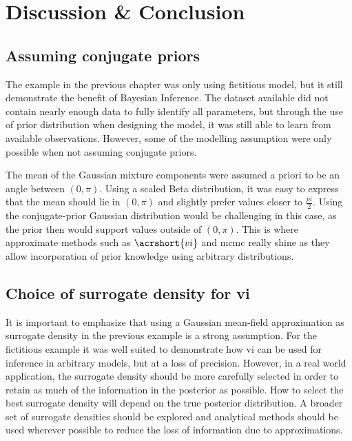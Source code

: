 \chapter{Discussion \& Conclusion}\label{chap:discussion}

\section{Assuming conjugate priors}\label{sec:discuss_conjugate_priors}
The example in the previous chapter was only using fictitious model, but it still demonstrate the benefit of Bayesian Inference. The dataset available did not contain nearly enough data to fully identify all parameters, but through the use of prior distribution when designing the model, it was still able to learn from available observations. However, some of the modelling assumption were only possible when not assuming conjugate priors.

The mean of the Gaussian mixture components were assumed a priori to be an angle between $(0, \pi)$. Using a scaled Beta distribution, it was easy to express that the mean should lie in $(0, \pi)$ and slightly prefer values closer to $\frac{pi}{2}$. Using the conjugate-prior Gaussian distribution would be challenging in this case, as the prior then would support values outside of $(0, \pi)$. This is where approximate methods such as $\acrshort{vi}$ and \acrshort{mcmc} really shine as they allow incorporation of prior knowledge using arbitrary distributions.  

\section{Choice of surrogate density for \acrshort{vi}}
It is important to emphasize that using a Gaussian mean-field approximation as surrogate density in the previous example is a strong assumption. For the fictitious example it was well suited to demonstrate how \acrshort{vi} can be used for inference in arbitrary models, but at a loss of precision. However, in a real world application, the surrogate density should be more carefully selected in order to retain as much of the information in the posterior as possible. How to select the best surrogate density will depend on the true posterior distribution. A broader set of surrogate densities should be explored and analytical methods should be used wherever possible to reduce the loss of information due to approximations. 

